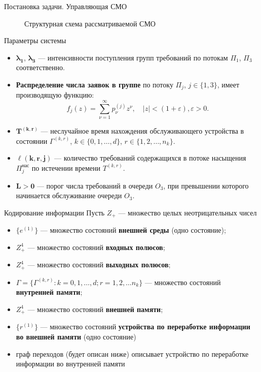 \documentclass[10pt]{beamer}
\begin{document}
\begin{frame}{Постановка задачи. Управляющая СМО}
  \begin{figure}[h]
    \centering
    \caption{Структурная схема рассматриваемой СМО}
    \label{VK:fig:2}
  \end{figure}
\end{frame} 


\begin{frame}{Параметры системы}
\begin{itemize}
    \item 
$\boldsymbol{\lambda_1}$, $\boldsymbol{\lambda_3}$ --- интенсивности поступления групп требований по потокам  $\Pi_1$, $\Pi_3$ соответственно.
  \item 
\textbf{Распределение числа заявок в группе} по потоку $\Pi_j$, $j \in \{1,3\}$, имеет производящую функцию:
$$
f_j(z) = \sum_{\nu=1}^{\infty} p_{\nu}^{(j)} z ^{\nu}, \quad |z|<(1+\varepsilon), \varepsilon>0.
$$
  \item 
$\boldsymbol{T^{(k,r)}}$ --- неслучайное время нахождения обслуживающего устройства в состоянии $\Gamma^{(k,r)}$, $k\in \{0, 1, \ldots, d\}$, $r \in \{1, 2, \ldots, n_k\}$.  
  \item 
$\boldsymbol{\ell(k,r,j)}$ --- количество требований содержащихся в потоке насыщения $\Pi^{\text{нас}}_j$ по истечении времени $T^{(k,r)}$.
  \item 
$\boldsymbol{L > 0}$ --- порог числа требований в очереди $O_3$, при превышении которого начинается обслуживание очереди $O_3$.
\end{itemize}

\end{frame}

\begin{frame}{Кодирование информации}
Пусть $Z_+$ --- множество целых неотрицательных чисел
  \begin{itemize}
  \item $\{e^{(1)}\}$ --- множество состояний \textbf{внешней среды} (одно состояние);
  \item $Z^4_+$ --- множество состояний \textbf{входных полюсов};
  \item $Z^4_+$ --- множество состояний \textbf{выходных полюсов};
 \item $\Gamma=\{\Gamma^{(k,r)} \colon k=0,1,\ldots,d; r=1,2,\ldots n_k\}$ --- множество состояний \textbf{внутренней памяти};
   \item $Z^4_+$ --- множество состояний \textbf{внешней памяти};
   \item $\{r^{(1)}\}$ --- множество состояний \textbf{устройства по переработке информации во внешней памяти} (одно состояние)
   \item граф переходов (будет описан ниже) описывает устройство по переработке информации во внутренней памяти
   \end{itemize}
\end{frame}
\end{document}
